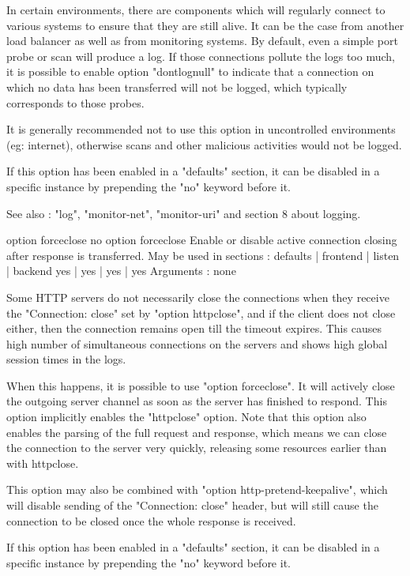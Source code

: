   In certain environments, there are components which will regularly connect to
  various systems to ensure that they are still alive. It can be the case from
  another load balancer as well as from monitoring systems. By default, even a
  simple port probe or scan will produce a log. If those connections pollute
  the logs too much, it is possible to enable option "dontlognull" to indicate
  that a connection on which no data has been transferred will not be logged,
  which typically corresponds to those probes.

  It is generally recommended not to use this option in uncontrolled
  environments (eg: internet), otherwise scans and other malicious activities
  would not be logged.

  If this option has been enabled in a "defaults" section, it can be disabled
  in a specific instance by prepending the "no" keyword before it.

  See also : "log", "monitor-net", "monitor-uri" and section 8 about logging.


option forceclose
no option forceclose
  Enable or disable active connection closing after response is transferred.
  May be used in sections :   defaults | frontend | listen | backend
                                 yes   |    yes   |   yes  |   yes
  Arguments : none

  Some HTTP servers do not necessarily close the connections when they receive
  the "Connection: close" set by "option httpclose", and if the client does not
  close either, then the connection remains open till the timeout expires. This
  causes high number of simultaneous connections on the servers and shows high
  global session times in the logs.

  When this happens, it is possible to use "option forceclose". It will
  actively close the outgoing server channel as soon as the server has finished
  to respond. This option implicitly enables the "httpclose" option. Note that
  this option also enables the parsing of the full request and response, which
  means we can close the connection to the server very quickly, releasing some
  resources earlier than with httpclose.

  This option may also be combined with "option http-pretend-keepalive", which
  will disable sending of the "Connection: close" header, but will still cause
  the connection to be closed once the whole response is received.

  If this option has been enabled in a "defaults" section, it can be disabled
  in a specific instance by prepending the "no" keyword before it.

